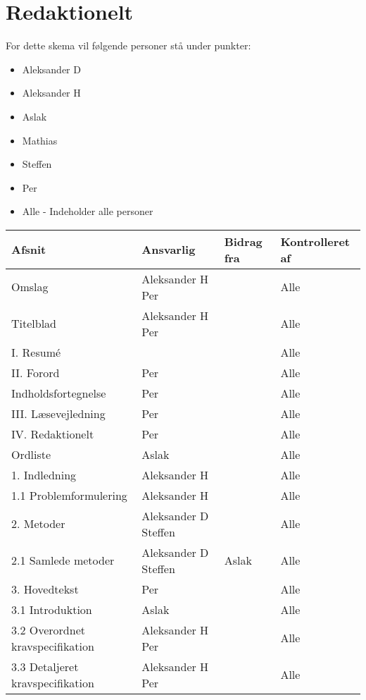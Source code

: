 \chapter{Redaktionelt}
For dette skema vil følgende personer stå under punkter: 
\begin{itemize}
\item Aleksander D
\item Aleksander H
\item Aslak
\item Mathias
\item Steffen
\item Per
\item Alle - Indeholder alle personer 
\end{itemize}

\begin{center}
\begin{longtable}{|m{5.8cm}|m{3.5cm}|m{3.5cm}|m{3.2cm}|}
\hline
\textbf{Afsnit} & \textbf{Ansvarlig} & \textbf{Bidrag fra} & \textbf{Kontrolleret af} \\
\hline
Omslag & Aleksander H \newline Per & & Alle\\
\hline
Titelblad & Aleksander H \newline Per & & Alle\\
\hline
I. Resumé & & & Alle\\ \hline
II. Forord & Per & & Alle\\ \hline
Indholdsfortegnelse & Per & & Alle\\ \hline
III. Læsevejledning & Per & & Alle\\ \hline

IV. Redaktionelt & Per & & Alle\\ \hline
Ordliste & Aslak & & Alle\\ \hline

1. Indledning & Aleksander H & & Alle\\ \hline
1.1 Problemformulering & Aleksander H & & Alle\\ \hline

2. Metoder & Aleksander D \newline Steffen & & Alle\\ \hline
2.1 Samlede metoder & Aleksander D \newline Steffen & Aslak & Alle\\ \hline

3. Hovedtekst & Per & & Alle\\ \hline
3.1 Introduktion & Aslak & & Alle\\ \hline
3.2 Overordnet kravspecifikation & Aleksander H \newline Per& & Alle\\ \hline
3.3 Detaljeret kravspecifikation & Aleksander H \newline Per& & Alle\\ \hline


\end{longtable}
\end{center}
